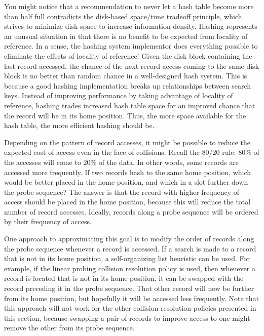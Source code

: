 You might notice that a recommendation to never let a hash table
become more than half full contradicts the disk-based space/time
tradeoff principle,
which strives to minimize disk space to increase information density.
Hashing represents an unusual situation in that there is no benefit to
be expected from locality of reference.
In a sense, the hashing system implementor does everything possible to
eliminate the effects of locality of reference!
Given the disk block containing the last record accessed, the chance
of the next record access coming to the same disk block is no better
than random chance in a well-designed hash system.
This is because a good hashing implementation breaks up relationships
between search keys.
Instead of improving performance by taking advantage of locality of
reference, hashing trades increased hash table space for an improved
chance that the record will be in its
home position.
Thus, the more space available for the hash table, the more efficient
hashing should be.

Depending on the pattern of record accesses, it might be possible to
reduce the expected cost of access even in the face of collisions.
Recall the 80/20 rule:
80\% of the accesses will come to 20\% of the data.
In other words, some records are accessed more frequently.
If two records hash to the same home position, which would be better
placed in the home position, and which in a slot further down the
probe sequence?
The answer is that the record with higher frequency of access should be
placed in the home position, because this will reduce the total number
of record accesses.
Ideally, records along a probe sequence will be ordered by their
frequency of access.

One approach to approximating this goal is to modify the order of
records along the probe sequence whenever a record is accessed.
If a search is made to a record that is not in its home position, a
self-organizing list heuristic can be
used.
For example, if the linear probing
collision resolution policy is
used, then whenever a record is located that is not in its home
position, it can be swapped with the record preceding it in the
probe sequence.
That other record will now be further from its home position, but
hopefully it will be accessed less frequently.
Note that this approach will not work for the other collision
resolution policies presented in this section, because swapping a pair
of records to improve access to one might remove the other from its
probe sequence.

